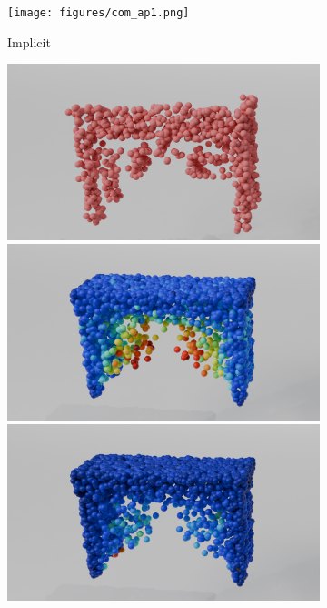 \begin{figure}[htb]
\begin{subfigure}[t]{\textwidth+20pt\relax}
            \texttt{[image: figures/com\_ap1.png]}
            \caption{Implicit}\label{fig:matchingwar1}
          \end{subfigure}\hfill
          \begin{subfigure}[t]{0.315\textwidth}
            \includegraphics[width=\textwidth]{figures/part_t1.png}
            \includegraphics[width=\textwidth]{figures/do_ind_t1.png}
            \includegraphics[width=\textwidth]{figures/do_lin_t1.png}

\end{subfigure}
\end{figure}

